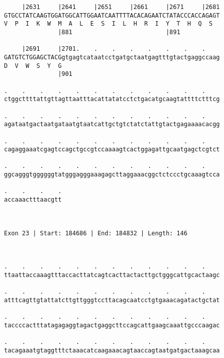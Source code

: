 \documentclass{article}
\begin{document}
\begin{Verbatim}
     |2631     |2641     |2651     |2661     |2671     |2681
GTGCCTATCAAGTGGATGGCATTGGAATCAATTTTACACAGAATCTATACCCACCAGAGT
V  P  I  K  W  M  A  L  E  S  I  L  H  R  I  Y  T  H  Q  S  
               |881                          |891           
  
     |2691     |2701.    .    .    .    .    .    .    .    
GATGTCTGGAGCTACGgtgagtcataatcctgatgctaatgagtttgtactgaggccaag
D  V  W  S  Y  G                                            
               |901                                         
  
.    .    .    .    .    .    .    .    .    .    .    .    
ctggcttttattgttagttaatttacattatatcctctgacatgcaagtattttctttcg
                                                            
.    .    .    .    .    .    .    .    .    .    .    .    
agataatgactaatgataatgtaatcattgctgtctatctattgtactgagaaaacacgg
                                                            
.    .    .    .    .    .    .    .    .    .    .    .    
cagaggaaatcgagtccagctgccgtccaaaagtcactggagattgcaatgagctcgtct
                                                            
.    .    .    .    .    .    .    .    .    .    .    .    
ggcagggtggggggtatgggagggaaagagcttaggaaacggctctccctgcaaagtcca
                                                            
.    .    .    .
accaaactttaacgtt
                
                
 
Exon 23 | Start: 184686 | End: 184832 | Length: 146



.    .    .    .    .    .    .    .    .    .    .    .    
ttaattaccaaagtttaccacttatcagtcacttactacttgctgggcattgcactaagc
                                                            
.    .    .    .    .    .    .    .    .    .    .    .    
atttcagttgtattatcttgttgggtccttacagcaatcctgtgaaacagatactgctat
                                                            
.    .    .    .    .    .    .    .    .    .    .    .    
taccccactttatagagaggtagactgaggcttccagcattgaagcaaattgcccaagac
                                                            
.    .    .    .    .    .    .    .    .    .    .    .    
tacagaaatgtaggtttctaaacatcaagaaacagtaaccagtaatgatgactaaagcaa
                                                            

\end{Verbatim}
\end{document}
